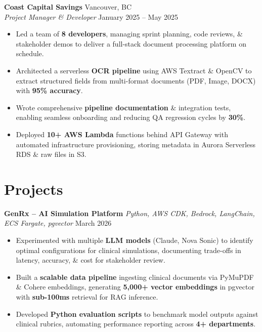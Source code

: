 \textbf{Coast Capital Savings} \hfill Vancouver, BC \\
\textit{Project Manager \& Developer} \hfill January 2025 -- May 2025
\begin{itemize}[nosep, leftmargin=1.5em, itemsep=2pt]
    \item Led a team of \textbf{8 developers}, managing sprint planning, code reviews, \& stakeholder demos to deliver a full-stack document processing platform on schedule.
    \item Architected a serverless \textbf{OCR pipeline} using AWS Textract \& OpenCV to extract structured fields from multi-format documents (PDF, Image, DOCX) with \textbf{95\% accuracy}.
    \item Wrote comprehensive \textbf{pipeline documentation} \& integration tests, enabling seamless onboarding and reducing QA regression cycles by \textbf{30\%}.
    \item Deployed \textbf{10+ AWS Lambda} functions behind API Gateway with automated infrastructure provisioning, storing metadata in Aurora Serverless RDS \& raw files in S3.
\end{itemize}

\section{Projects}

\textbf{GenRx -- AI Simulation Platform} \quad \textit{Python, AWS CDK, Bedrock, LangChain, ECS Fargate, pgvector} \hfill March 2026
\begin{itemize}[nosep, leftmargin=1.5em, itemsep=2pt]
    \item Experimented with multiple \textbf{LLM models} (Claude, Nova Sonic) to identify optimal configurations for clinical simulations, documenting trade-offs in latency, accuracy, \& cost for stakeholder review.
    \item Built a \textbf{scalable data pipeline} ingesting clinical documents via PyMuPDF \& Cohere embeddings, generating \textbf{5,000+ vector embeddings} in pgvector with \textbf{sub-100ms} retrieval for RAG inference.
    \item Developed \textbf{Python evaluation scripts} to benchmark model outputs against clinical rubrics, automating performance reporting across \textbf{4+ departments}.
\end{itemize}

